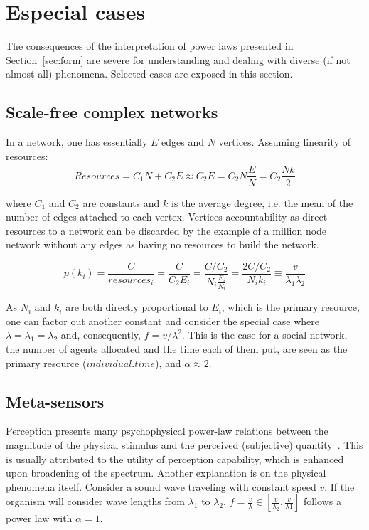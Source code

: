 \documentclass[a4paper, 11pt]{article} %
\begin{document}
\section{Especial cases}\label{sec:esp}
The consequences of the
interpretation of power laws presented in Section~\ref{sec:form}
are severe for understanding and dealing with
diverse (if not almost all)
phenomena. Selected cases are exposed in this section.


\subsection{Scale-free complex networks}

In a network, one has essentially $E$ edges and $N$ vertices.
Assuming linearity of resources:
\begin{equation}\label{eq:nre}
	Resources=C_1 N + C_2 E \approx C_2 E = C_2 N \frac{E}{N} = C_2 \frac{N \overline{k}}{2}
\end{equation}

\noindent where $C_1$ and $C_2$ are constants and $\overline{k}$ is
the average degree, i.e. the mean of the number of edges attached to each vertex.
Vertices accountability as direct resources to a network can be
discarded by the example of a million node network without
any edges as having no resources to build the network.

\begin{equation}\label{eq:eqf}
	p(k_i)=\frac{C}{resources_i}=\frac{C}{C_2 E_i}=\frac{C/C_2}{N_i \frac{E_i}{N_i}}=\frac{2C/C_2}{N_i k_i} \equiv \frac{v}{\lambda_1   \lambda_2}
\end{equation}

As $N_i$ and $k_i$ are both directly proportional to $E_i$, which is the primary resource, one can factor out another constant and consider the special case where $\lambda=\lambda_1=\lambda_2$ and, consequently, $f=v/\lambda^2$. This is the case for a social network, the number of agents allocated and the time each of them put, are seen as the primary resource ($individual . time$), and $\alpha\approx 2$.

\subsection{Meta-sensors}
Perception presents many psychophysical power-law 
relations between the
magnitude of the physical stimulus and the perceived 
(subjective) quantity~\cite{pbook}.
This is usually attributed to the utility of perception capability,
which is enhanced upon broadening of the spectrum.
Another explanation is on the physical phenomena itself.
Consider a sound wave traveling with constant speed $v$.
If the organism will consider wave lengths from $\lambda_1$
to $\lambda_2$, $f=\frac{v}{\lambda} \in [\frac{v}{\lambda_2},\frac{v}{\lambda1}]$ follows
a power law with $\alpha=1$.
\end{document}
